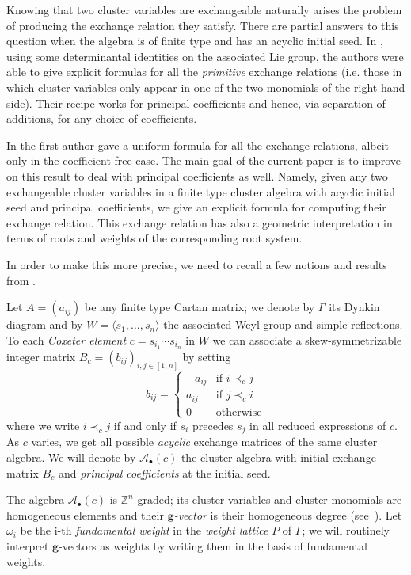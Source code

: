 \documentclass[pdftex]{sigma}
\numberwithin{equation}{section}
\numberwithin{theorem}{section}
\numberwithin{proposition}{section}
\numberwithin{lemma}{section}
\numberwithin{corollary}{section}
\numberwithin{definition}{section}
\numberwithin{example}{section}
\numberwithin{remark}{section}
\numberwithin{note}{section}
\newcommand{\cA}{\mathcal{A}}
\newcommand{\ZZ}{\mathbb{Z}}
\newcommand{\bg}{\mathbf{g}}
\begin{document}
  Knowing that two cluster variables are exchangeable naturally arises the problem of producing the exchange relation they satisfy.
  There are partial answers to this question when the algebra is of finite type and has an acyclic initial seed.
  In \cite{YZ08}, using some determinantal identities on the associated Lie group, the authors were able to give explicit formulas for all the \emph{primitive} exchange relations (i.e. those in which cluster variables only appear in one of the two monomials of the right hand side).
  Their recipe works for principal coefficients and hence, via separation of additions, for any choice of coefficients.

  In \cite{Ste13} the first author gave a uniform formula for all the exchange relations, albeit only in the coefficient-free case.
  The main goal of the current paper is to improve on this result to deal with principal coefficients as well.
  Namely, given any two exchangeable cluster variables in a finite type cluster algebra with acyclic initial seed and principal coefficients, we give an explicit formula for computing their exchange relation.
  This exchange relation has also a geometric interpretation in terms of roots and weights of the corresponding root system.


  In order to make this more precise, we need to recall a few notions and results from \cite{Ste13,YZ08}.

  Let $A=(a_{ij})$ be any finite type Cartan matrix; we denote by $\Gamma$ its Dynkin diagram and by $W=\langle s_1,\dots,s_n\rangle$ the associated Weyl group and simple reflections.
  To each \emph{Coxeter element} $c=s_{i_1}\cdots s_{i_n}$ in $W$ we can associate a skew-symmetrizable integer matrix $B_c=(b_{ij})_{i,j\in[1,n]}$ by setting
  \[
    b_{ij}=
    \begin{cases}
      -a_{ij} & \text{if } i\prec_c j  \\
      a_{ij}  & \text{if } j\prec_c i  \\
      0       & \text{otherwise}
    \end{cases}
  \]
  where we write $i\prec_c j$ if and only if $s_i$ precedes $s_j$ in all reduced expressions of $c$.
  As $c$ varies, we get all possible \emph{acyclic} exchange matrices of the same cluster algebra.
  We will denote by $\cA_\bullet(c)$ the cluster algebra with initial exchange matrix $B_c$ and  \emph{principal coefficients} at the initial seed.

  The algebra $\cA_\bullet(c)$ is $\ZZ^n$-graded; its cluster variables and cluster monomials are homogeneous elements and their \emph{$\bg$-vector} is their homogeneous degree (see~\cite[Section~6]{FZ07}).
  Let $\omega_i$ be the i-th \emph{fundamental weight} in the \emph{weight lattice} $P$ of $\Gamma$; we will routinely interpret $\bg$-vectors as weights by writing them in the basis of fundamental weights.
\end{document}
